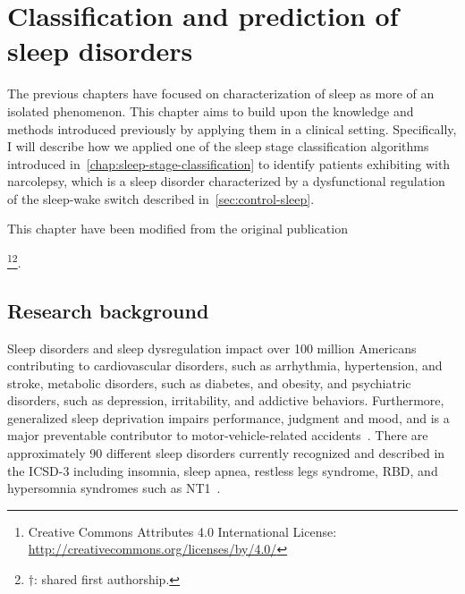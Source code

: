 \acresetall
\chapter{Classification and prediction of sleep disorders}\label{chap:classification-sleep-disorders}
\vspace{6cm}

The previous chapters have focused on characterization of sleep as more of an isolated phenomenon.
This chapter aims to build upon the knowledge and methods introduced previously by applying them in a clinical setting.
Specifically, I will describe how we applied one of the sleep stage classification algorithms introduced in~\cref{chap:sleep-stage-classification} to identify patients exhibiting with narcolepsy, which is a sleep disorder characterized by a dysfunctional regulation of the sleep-wake switch described in~\cref{sec:control-sleep}.

This chapter have been modified from the original publication  
\begin{displayquote}
    \footnote{Creative Commons Attributes 4.0 International License: \url{http://creativecommons.org/licenses/by/4.0/}}\footnote{\(\dagger\): shared first authorship.}.
\end{displayquote}

\section{Research background}

Sleep disorders and sleep dysregulation impact over \num{100} million Americans contributing to cardiovascular disorders, such as arrhythmia, hypertension, and stroke, metabolic disorders, such as diabetes, and obesity, and psychiatric disorders, such as depression, irritability, and addictive behaviors. 
Furthermore, generalized sleep deprivation impairs performance, judgment and mood, and is a major preventable contributor to motor-vehicle-related accidents~\cite{Krieger2007}.
There are approximately 90 different sleep disorders currently recognized and described in the \ac{ICSD-3} including insomnia, sleep apnea, restless legs syndrome, \ac{RBD}, and hypersomnia syndromes such as \ac{NT1}~\cite{AmericanAcademyofSleepMedicine2014}.

